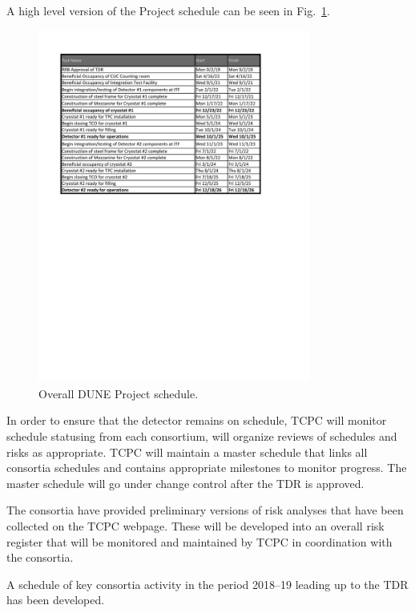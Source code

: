 A high level version of the 
Project schedule can be seen in Fig.~\ref{fig:DUNE_schedule}.
\begin{figure}[htb]
  \begin{center}
    \includegraphics[width=0.8\textwidth]{far-detector-generic/figures/FD_Cnst_Schedule}
    \caption{Overall DUNE Project schedule.}
    \label{fig:DUNE_schedule}
  \end{center}
\end{figure}
In order to ensure that the  detector remains on schedule, TCPC
will monitor schedule statusing from each consortium, will organize
reviews of schedules and risks as appropriate. TCPC will maintain a
master schedule that links all consortia schedules and contains
appropriate milestones to monitor progress. The master schedule will
go under change control after the TDR is approved.

The consortia have provided preliminary versions of risk analyses that
have been collected on the TCPC webpage. These will be developed into
an overall risk register that will be monitored and maintained by TCPC
in coordination with the consortia.

A schedule of key consortia activity in the period 2018--19 leading up
to the TDR has been developed.

